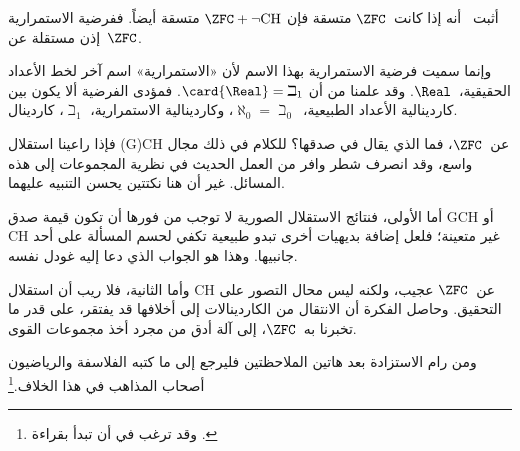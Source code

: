 \documentclass[../../../include/open-logic-section]{subfiles}
\begin{document}
أثبت~\citet{Cohen1963} أنه إذا كانت~$\ZFC$ متسقة فإن
$\ZFC + \lnot\text{CH}$ متسقة أيضاً. ففرضية الاستمرارية إذن مستقلة
عن~$\ZFC$.

وإنما سميت فرضية الاستمرارية بهذا الاسم لأن «الاستمرارية» اسم آخر لخط
الأعداد الحقيقية،~$\Real$. وقد علمنا من
 أن
$\card{\Real} = \beth_1$. فمؤدى الفرضية ألا يكون بين كاردينالية
الأعداد الطبيعية،~$\aleph_0 = \beth_0$، وكاردينالية الاستمرارية،
$\beth_1$، كاردينال.

فإذا راعينا استقلال (G)CH عن~$\ZFC$، فما الذي يقال في صدقها؟ للكلام
في ذلك مجال واسع، وقد انصرف شطر وافر من العمل الحديث في نظرية
المجموعات إلى هذه المسائل. غير أن هنا نكتتين يحسن التنبيه عليهما.

أما الأولى، فنتائج الاستقلال الصورية لا توجب من فورها أن تكون قيمة صدق
GCH أو CH غير متعينة؛ فلعل إضافة بديهيات أخرى تبدو طبيعية تكفي لحسم
المسألة على أحد جانبيها. وهذا هو الجواب الذي دعا إليه غودل نفسه.

وأما الثانية، فلا ريب أن استقلال CH عن~$\ZFC$ عجيب، ولكنه ليس محال
التصور على التحقيق. وحاصل الفكرة أن الانتقال من الكاردينالات إلى
أخلافها قد يفتقر، على قدر ما تخبرنا به~$\ZFC$، إلى آلة أدق من مجرد أخذ
مجموعات القوى.

ومن رام الاستزادة بعد هاتين الملاحظتين فليرجع إلى ما كتبه الفلاسفة
والرياضيون أصحاب المذاهب في هذا الخلاف.\footnote{وقد ترغب في
أن تبدأ بقراءة \citet[\S15.6]{Potter2004}.}
\end{document}
